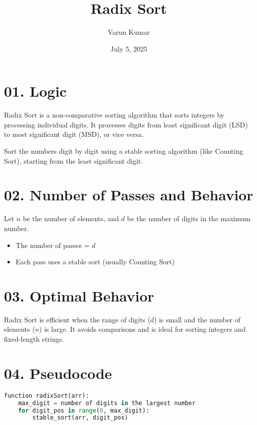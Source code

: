 \documentclass[14pt]{extarticle}
\title{\textbf{Radix Sort}}
\author{Varun Kumar}
\date{July 5, 2025}
\begin{document}
\maketitle

\section*{01. Logic}

Radix Sort is a non-comparative sorting algorithm that sorts integers by processing individual digits. It processes digits from least significant digit (LSD) to most significant digit (MSD), or vice versa.

\begin{tcolorbox}[
  colback=white,
  colframe=black,
  title=Key Idea
]
Sort the numbers digit by digit using a stable sorting algorithm (like Counting Sort), starting from the least significant digit.
\end{tcolorbox}

\section*{02. Number of Passes and Behavior}

Let $n$ be the number of elements, and $d$ be the number of digits in the maximum number.

\begin{itemize}
    \item The number of passes = $d$
    \item Each pass uses a stable sort (usually Counting Sort)
\end{itemize}

\section*{03. Optimal Behavior}

Radix Sort is efficient when the range of digits ($d$) is small and the number of elements ($n$) is large. It avoids comparisons and is ideal for sorting integers and fixed-length strings.

\section*{04. Pseudocode}

\begin{lstlisting}[language=Python]
function radixSort(arr):
    max_digit = number of digits in the largest number
    for digit_pos in range(0, max_digit):
        stable_sort(arr, digit_pos)
\end{lstlisting}
\end{document}
